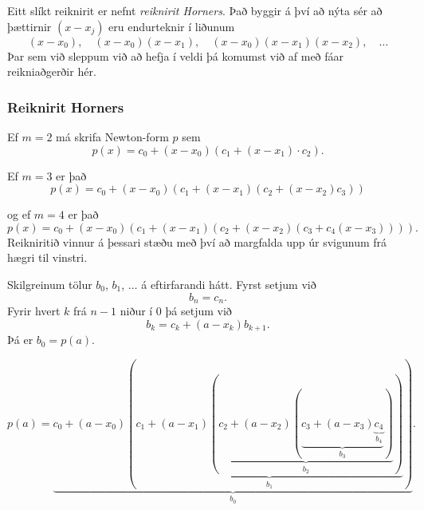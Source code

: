\documentclass[icelandic,a4paper,12pt]{article}
\begin{document}
\smallskip
Eitt slíkt reiknirit er nefnt 
{\it reiknirit Horners}. Það byggir á því að nýta sér að þættirnir
$(x-x_j)$  eru endurteknir í liðunum
\begin{equation*}
	(x-x_0), \quad (x-x_0)(x-x_1), 
	\quad (x-x_0)(x-x_1)(x-x_2), \quad \ldots
\end{equation*}
Þar sem við sleppum við að hefja í veldi þá komumst við af með 
fáar reikniaðgerðir hér.


\subsubsection{Reiknirit Horners} 

Ef $m = 2$ má skrifa Newton-form $p$ sem
\begin{equation*}
	p(x) = c_0 + (x-x_0)(c_1 + (x-x_1) \cdot c_2).
\end{equation*}

\pause
Ef $m = 3$ er það
\begin{equation*}
	p(x) = c_0 + (x-x_0)(c_1 + (x-x_1)(c_2 + (x-x_2)c_3))
\end{equation*}

\pause
og ef $m = 4$ er það
\begin{equation*}
	p(x) = c_0 + (x-x_0)(c_1 + (x-x_1)(c_2 + (x-x_2)
	(c_3 + c_4(x-x_3)))).
\end{equation*}
Reikniritið vinnur á þessari stæðu með því að margfalda upp úr
svigunum frá hægri til vinstri. 



Skilgreinum tölur $b_0$, $b_1$, $\ldots$ á eftirfarandi hátt.
Fyrst setjum við 
$$b_n = c_n.$$
Fyrir hvert $k$ frá $n-1$ niður í 0 þá setjum við
\[
	b_k = c_k + (a - x_k) b_{k+1}.
\]
\pause
Þá er $b_0 = p(a)$. 

\medskip
\pause

 \begin{equation*}
	p(a) = 
	\underbrace{
	  c_0 + (a-x_0)(
	  \underbrace{
	    c_1 + (a-x_1)(
	      \underbrace{c_2 + (a-x_2)(
		\underbrace{c_3 + (a-x_3)
		  \underbrace{c_4}_{b_4}
	      }_{b_3})
	    }_{b_2})
	  }_{b_1})
	}_{b_0}.
\end{equation*}
\end{document}
